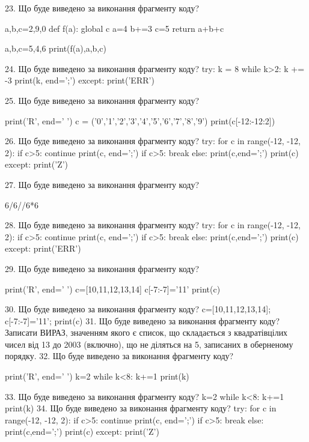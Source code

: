 \documentclass[11pt]{article}
\begin{document}
23. Що буде виведено за виконання фрагменту коду?

a,b,c=2,9,0
def f(a):
global c    a=4
    b+=3
    c=5
    return a+b+c

a,b,c=5,4,6
print(f(a),a,b,c)

24. Що буде виведено за виконання фрагменту коду?
try:
    k = 8
    while k>2:
        k += -3
    print(k, end=';')
except:
    print('ERR')

25. Що буде виведено за виконання фрагменту коду?

print('R', end=' ')
c = ('0','1','2','3','4','5','6','7','8','9')
print(c[-12:-12:2])


26. Що буде виведено за виконання фрагменту коду?
try:
    for c in range(-12, -12, 2):
        if c>5:
            continue
        print(c, end=';')
        if c>5:
            break
    else:
        print(c,end=';')
    print(c)
except:
    print('Z')

27. Що буде виведено за виконання фрагменту коду?

6/6//6*6

28. Що буде виведено за виконання фрагменту коду?
try:
    for c in range(-12, -12, 2):
        if c>5:
            continue
        print(c, end=';')
        if c>5:
            break
    else:
        print(c,end=';')
    print(c)
except:
    print('ERR')

29. Що буде виведено за виконання фрагменту коду?

print('R', end=' ')
c=[10,11,12,13,14]
c[-7:-7]='11'
print(c)


30. Що буде виведено за виконання фрагменту коду?
c=[10,11,12,13,14]; c[-7:-7]='11'; print(c)
31. Що буде виведено за виконання фрагменту коду?
Записати ВИРАЗ, значенням якого є список, що складається з квадратівцілих чисел від 13 до 2003 (включно), що не діляться на 5, записаних в оберненому порядку.
32. Що буде виведено за виконання фрагменту коду?

print('R', end=' ')
k=2
while k<8:
    k+=1
print(k)


33. Що буде виведено за виконання фрагменту коду?
k=2
   while k<8: k+=1
   print(k)
34. Що буде виведено за виконання фрагменту коду?
try:
    for c in range(-12, -12, 2):
        if c>5:
            continue
        print(c, end=';')
        if c>5:
            break
    else:
        print(c,end=';')
    print(c)
except:
    print('Z')
\end{document}

